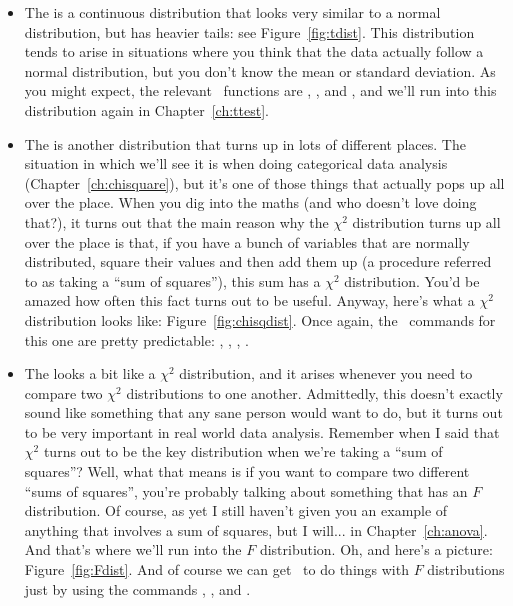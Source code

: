 \begin{itemize}
\item  The  is a continuous distribution that looks very similar to a normal distribution, but has heavier tails: see Figure~\ref{fig:tdist}. This distribution tends to arise in situations where you think that the data actually follow a normal distribution, but you don't know the mean or standard deviation. As you might expect, the relevant \R\ functions are , ,  and , and we'll run into this distribution again in Chapter~\ref{ch:ttest}. 

\item The  is another distribution that turns up in lots of different places. The situation in which we'll see it is when doing categorical data analysis (Chapter~\ref{ch:chisquare}), but it's one of those things that actually pops up all over the place. When you dig into the maths (and who doesn't love doing that?), it turns out that the main reason why the $\chi^2$ distribution turns up all over the place is that, if you have a bunch of variables that are normally distributed, square their values and then add them up (a procedure referred to as taking a ``sum of squares''), this sum has a $\chi^2$ distribution. You'd be amazed how often this fact turns out to be useful. Anyway, here's what a $\chi^2$ distribution looks like: Figure~\ref{fig:chisqdist}.  Once again, the \R\ commands for this one are pretty predictable: ,  ,  , .

\item The  looks a bit like a $\chi^2$ distribution, and it arises whenever you need to compare two $\chi^2$ distributions to one another. Admittedly, this doesn't exactly sound like something that any sane person would want to do, but it turns out to be very important in real world data analysis. Remember when I said that $\chi^2$ turns out to be the key distribution when we're taking a ``sum of squares''? Well, what that means is if you want to compare two different ``sums of squares'', you're probably talking about something that has an $F$ distribution. Of course, as yet I still haven't given you an example of anything that involves a sum of squares, but I will... in Chapter~\ref{ch:anova}. And that's where we'll run into the $F$ distribution. Oh, and here's a picture: Figure~\ref{fig:Fdist}. And of course we can get \R\ to do things with $F$ distributions just by using the commands , ,  and .

\end{itemize}

